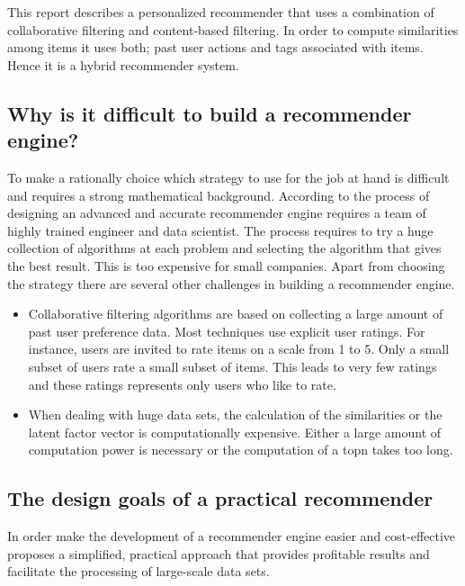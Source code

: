 This report describes a personalized recommender that uses a combination of collaborative filtering and content-based filtering. In order to compute similarities among items it uses both; past user actions and \glspl{tag} associated with items. Hence it is a hybrid recommender system.

\subsection{Why is it difficult to build a recommender engine?}

To make a rationally choice which strategy to use for the job at hand is difficult and requires a strong mathematical background. According to  \cite{Dunning14} the process of designing an advanced and accurate recommender engine requires a team of highly trained engineer and data scientist. The process requires to try a huge collection of algorithms at each problem and selecting the algorithm that gives the best result. This is too expensive for small companies. Apart from choosing the strategy there are several other challenges in building a recommender engine.

\begin{itemize}
\item Collaborative filtering algorithms are based on collecting a large amount of past user preference data. Most techniques use explicit user ratings. For instance, users are invited to rate items on a scale from 1 to 5. Only a small subset of users rate a small subset of items. This leads to very few ratings and these ratings represents only users who like to rate.

\item When dealing with huge data sets, the calculation of the similarities or the latent factor vector is computationally expensive. Either a large amount of computation power is necessary or the computation of a \gls{topn} takes too long.
\end{itemize}

\subsection{The design goals of a practical recommender}
\label{sec:practical}

In order make the development of a recommender engine easier and cost-effective \cite{Dunning14} proposes a simplified, practical approach that provides profitable results and facilitate the processing of large-scale data sets. 

